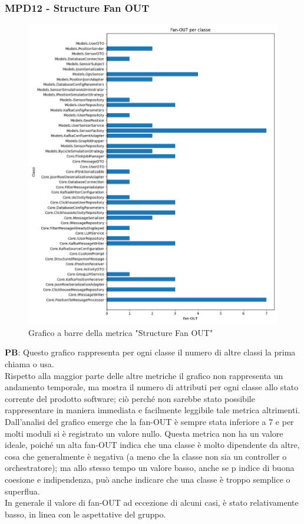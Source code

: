\documentclass[10pt]{article}
\begin{document}
\begin{justify}
\subsubsection{MPD12 - Structure Fan OUT}

\begin{figure}[H]
  \centering
  \includegraphics[width=0.9\linewidth]{metrics_fan_out.png}
  \caption{Grafico a barre della metrica "Structure Fan OUT"}
\end{figure}

\textbf{PB}: Questo grafico rappresenta per ogni classe il numero di altre classi la prima chiama o usa.\\
Rispetto alla maggior parte delle altre metriche il grafico non rappresenta un andamento temporale, ma mostra il numero di attributi per ogni classe allo stato 
corrente del prodotto software; ciò perché non sarebbe stato possibile rappresentare in maniera immediata e  facilmente leggibile tale metrica altrimenti.\\
Dall'analisi del grafico emerge che la fan-OUT è sempre stata inferiore a 7 e per molti moduli si è registrato un valore nullo. Questa metrica non ha un valore ideale,
poiché un alta fan-OUT indica che una classe è molto dipendente da altre, cosa che generalmente è negativa (a meno che la classe non sia un controller o orchestratore); 
ma allo stesso tempo un valore basso, anche se p indice di buona coesione e indipendenza, può anche indicare che una classe è troppo semplice o superflua.\\
In generale il valore di fan-OUT ad eccezione di alcuni casi, è stato relativamente basso, in linea con le aspettative del gruppo.\\



\end{justify}
\end{document}
